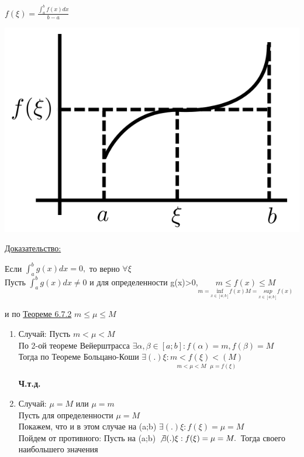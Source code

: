 \documentclass[12pt]{article}
\let\ORIincludegraphics\includegraphics
\renewcommand{\includegraphics}[2][]{\ORIincludegraphics[scale=0.65,#1]{#2}}
\begin{document}
\begin{enumerate}
\begin{adjustwidth}{1.5em}{1.5em}
            $f(\xi)=\frac{\int_{a}^{b} f(x)dx}{b-a}$\\
            \begin{center}
                \includegraphics[width=0.7\linewidth]{6.7.2.png}
            \end{center}
            \underline{Доказательство:}
            \begin{adjustwidth}{1.5em}{1.5em}
                Если $\int_{a}^{b} g(x)dx=0,$ то верно $\forall \xi$\\
                Пусть $\int_{a}^{b} g(x)dx \not = 0$ и для определенности g(x)>0,$\underset{m=\underset{x \in [a;b]}{\text{inf}}f(x) M=\underset{x \in [a;b]}{sup}f(x)}{m\leq f(x) \leq M}$\\ 
            \end{adjustwidth}
            и по \hyperref[th:6.7.2]{Теореме 6.7.2} $m \leq \mu \leq M$\\
            \begin{enumerate}
                \item Случай: Пусть $m<\mu<M$\\
                По 2-ой теореме Вейерштрасса $\exists \alpha, \beta \in [a;b]: f(\alpha) = m,f(\beta) = M$\\
                Тогда по Теореме Больцано-Коши $\exists (.) \xi:\underset{m<\mu <M \text{   } \mu=f(\xi)}{m<f(\xi)<(M)}$
                \begin{center}
                    \textbf{Ч.т.д.}
                \end{center}
                \item Случай: $\mu=M \text{ или } \mu=m$\\
                Пусть для определенности $\mu=M$\\
                Покажем, что и в этом случае на (a;b) $\exists (.) \xi: f(\xi)=\mu=M$\\
                Пойдем от противного: Пусть на (a;b) $\not \exists (.) \xi:f(\xi)=\mu=M.$ Тогда своего наибольшего значения

\end{enumerate}
\end{adjustwidth}
\end{enumerate}
\end{document}
